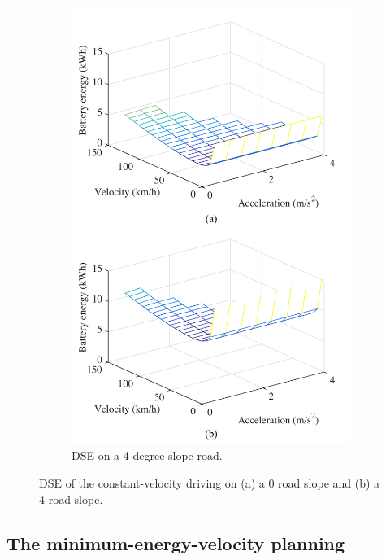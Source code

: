 \documentclass{IEEEtran}
\begin{document}
\begin{figure}
\begin{subfigure}{0.45\textwidth}
	\includegraphics[width=\hsize]{Figures/Design_space_exploration_bottom.pdf}
	\caption{DSE on a 4-degree slope road.}
	\label{fig:DSE_4_slope}
	\end{subfigure}
\caption{DSE of  the constant-velocity driving on (a) a 0 road slope and (b) a 4 road slope.}
\end{figure}



\subsection{The minimum-energy-velocity planning} \label{subsec:variable drive}
\end{document}
